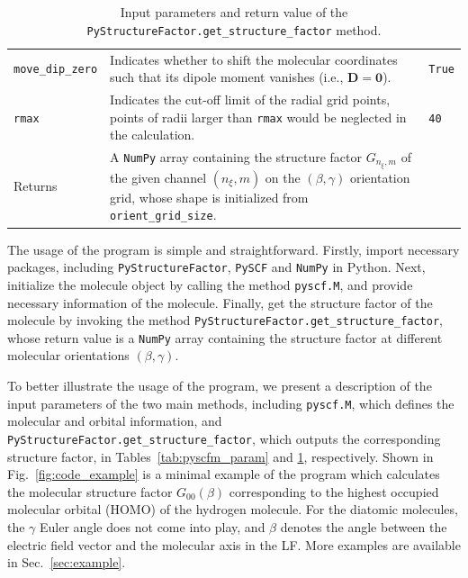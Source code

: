 \documentclass[preprint,12pt]{elsarticle} %
\newcommand{\bn}[1]{\mathbf{#1}}    %
\begin{document}
\begin{table}[tb]
\begin{tabular}{l p{12cm} l}
        \texttt{move\_dip\_zero}    & Indicates whether to shift the molecular coordinates such that its dipole moment vanishes
                                      (i.e., $\bn{D}=\bn{0}$).                                                                                  & \texttt{True}     \\
        \texttt{rmax}               & Indicates the cut-off limit of the radial grid points,
                                      points of radii larger than \texttt{rmax} would be neglected in the calculation.                          & \texttt{40}       \\
        \hline
        Returns                     & A \texttt{NumPy} array containing the structure factor $G_{n_\xi,m}$ of the given channel $(n_\xi,m)$
                                      on the $(\beta,\gamma)$ orientation grid, whose shape is initialized from \texttt{orient\_grid\_size}. \\
        \hline \hline
    \end{tabular}
    \caption{Input parameters and return value of the \texttt{PyStructureFactor.get\_structure\_factor} method.}
    \label{tab:getsf_param}
\end{table}

The usage of the program is simple and straightforward.
Firstly, import necessary packages, including \texttt{PyStructureFactor}, \texttt{PySCF} and \texttt{NumPy} in Python.
Next, initialize the molecule object by calling the method \texttt{pyscf.M}, and provide necessary information of the molecule.
Finally, get the structure factor of the molecule by invoking the method \texttt{PyStructureFactor.get\_structure\_factor}, whose return value is a \texttt{NumPy} array containing the structure factor at different molecular orientations $(\beta,\gamma)$.

To better illustrate the usage of the program, we present a description of the input parameters of the two main methods, including \texttt{pyscf.M}, which defines the molecular and orbital information, and \texttt{PyStructureFactor.get\_structure\_factor}, which outputs the corresponding structure factor, in Tables~\ref{tab:pyscfm_param} and \ref{tab:getsf_param}, respectively.
Shown in Fig.~\ref{fig:code_example} is a minimal example of the program which calculates the molecular structure factor $G_{00}(\beta)$ corresponding to the highest occupied molecular orbital (HOMO) of the hydrogen molecule. For the diatomic molecules, the $\gamma$ Euler angle does not come into play, and $\beta$ denotes the angle between the electric field vector and the molecular axis in the LF.
More examples are available in Sec.~\ref{sec:example}.
\end{document}
